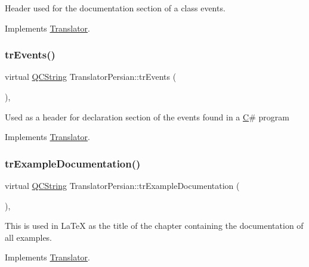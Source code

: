 Header used for the documentation section of a class\textquotesingle{} events. 

Implements \mbox{\hyperlink{class_translator}{Translator}}.

\mbox{\label{class_translator_persian_a7270d6a4d299cc548507c03d3148b687}} 
\subsubsection{\texorpdfstring{trEvents()}{trEvents()}}
{\footnotesize\ttfamily virtual \mbox{\hyperlink{class_q_c_string}{Q\+C\+String}} Translator\+Persian\+::tr\+Events (\begin{DoxyParamCaption}{ }\end{DoxyParamCaption})\hspace{0.3cm}{\ttfamily [inline]}, {\ttfamily [virtual]}}

Used as a header for declaration section of the events found in a \mbox{\hyperlink{class_c}{C}}\# program 

Implements \mbox{\hyperlink{class_translator}{Translator}}.

\mbox{\label{class_translator_persian_aa6727c823cb56954d8f6e775cb59a12d}} 
\subsubsection{\texorpdfstring{trExampleDocumentation()}{trExampleDocumentation()}}
{\footnotesize\ttfamily virtual \mbox{\hyperlink{class_q_c_string}{Q\+C\+String}} Translator\+Persian\+::tr\+Example\+Documentation (\begin{DoxyParamCaption}{ }\end{DoxyParamCaption})\hspace{0.3cm}{\ttfamily [inline]}, {\ttfamily [virtual]}}

This is used in La\+TeX as the title of the chapter containing the documentation of all examples. 

Implements \mbox{\hyperlink{class_translator}{Translator}}.

\mbox{\label{class_translator_persian_a3b094f0a4aea8d77f42e7a1d29c2d4ca}} 
